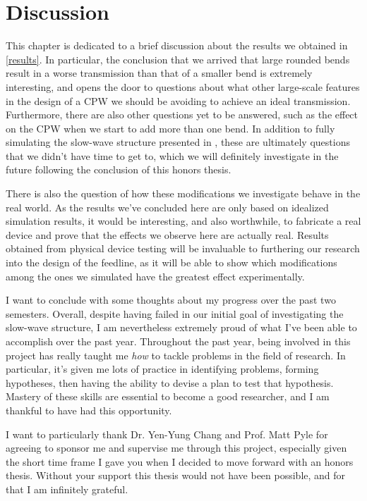 \chapter{Discussion}
This chapter is dedicated to a brief discussion about the results we obtained in \cref{results}. In
particular, the conclusion that we arrived that large rounded bends result in a worse transmission than that
of a smaller bend is extremely interesting, and opens the door to questions about what other large-scale
features in the design of a CPW we should be avoiding to achieve an ideal transmission.    
Furthermore, there are also other questions yet to be answered, such as the effect on the CPW when we start
to add more than one bend. In addition to fully simulating the slow-wave structure presented in 
\cite{hosaengkimWireBondFreeTechnique2009}, these are ultimately questions that we didn't have time to get
to, which we will definitely investigate in the future following the conclusion of this honors thesis.

There is also the question of how these modifications we investigate behave in the real world. As the results
we've concluded here are only based on idealized simulation results, it would be interesting, 
and also worthwhile, to     
fabricate a real device and prove that the effects we observe here are actually real. Results obtained from
physical device testing will be invaluable to furthering our research into the design of the feedline, as it will be
able to show which modifications among the ones we simulated have the greatest effect experimentally.        

I want to conclude with some thoughts about my progress over the past two semesters. Overall, despite having
failed in our initial goal of investigating the slow-wave structure, I am nevertheless extremely proud of
what I've been able to accomplish over the past year. Throughout the past year, being involved in this
project has really taught me \textit{how} to tackle problems in the field of research. In particular, it's
given me lots of practice in identifying problems, forming hypotheses, then having the ability to devise a
plan to test that hypothesis. Mastery of these skills are essential to become a good researcher, and I am
thankful to have had this opportunity.

I want to particularly thank Dr. Yen-Yung Chang and Prof. Matt Pyle for agreeing to sponsor me and supervise me
through this project, especially given the short time frame I gave you when I decided to move forward with an
honors thesis. Without your support this thesis would not have been possible, and for that I am infinitely
grateful. 





